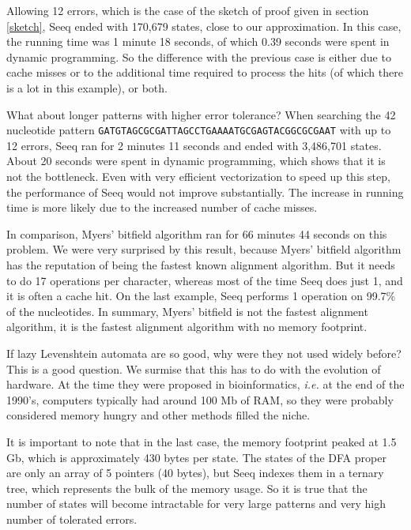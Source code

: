 \documentclass[12pt]{article}
\begin{document}
Allowing 12 errors, which is the case of the sketch
of proof given in section \ref{sketch}, Seeq ended with 170,679 states,
close to our approximation. In this case, the running time
was 1 minute 18 seconds, of which 0.39 seconds were spent in dynamic
programming. So the difference with the previous case is either
due to cache misses or to the additional time required to process
the hits (of which there is a lot in this example), or both.

What about longer patterns with higher error tolerance?
When searching the 42 nucleotide pattern
\texttt{GATGTAGCGCGATTAGCCTGAAAATGCGAGTACGGCGCGAAT} with
up to 12 errors, Seeq ran for 2 minutes 11 seconds and ended with
3,486,701 states. About 20 seconds were spent in dynamic programming,
which shows that it is not the bottleneck.
Even with very efficient vectorization to speed up this step, the
performance of Seeq would not improve substantially. The increase
in running time is more likely due to the increased number of cache
misses.

In comparison, Myers' bitfield algorithm ran for 66 minutes
44 seconds on this problem. %
We were very surprised by this result, because Myers' bitfield
algorithm has the reputation of being the fastest known alignment
algorithm. But it needs to do 17 operations per character, whereas
most of the time Seeq does just 1, and it is often a cache hit. On
the last example, Seeq performs 1 operation on 99.7\% of the
nucleotides. In summary, Myers' bitfield is not the fastest
alignment algorithm, it is the fastest alignment algorithm with
no memory footprint.

If lazy Levenshtein automata are so good, why were they not used
widely before? This is a good question. We surmise that this has
to do with the evolution of hardware. At the time they were proposed
in bioinformatics, \textit{i.e.} at the end of the 1990's, computers
typically had around 100 Mb of RAM, so they were probably considered
memory hungry and other methods filled the niche.

It is important to note that in the last case, the memory footprint
peaked at 1.5 Gb, which is approximately 430 bytes per state. The
states of the DFA proper are only an array of 5 pointers (40 bytes),
but Seeq indexes them in a ternary tree, which represents the bulk
of the memory usage. So it is true that the number of states will
become intractable for very large patterns and very high number of
tolerated errors.
\end{document}
